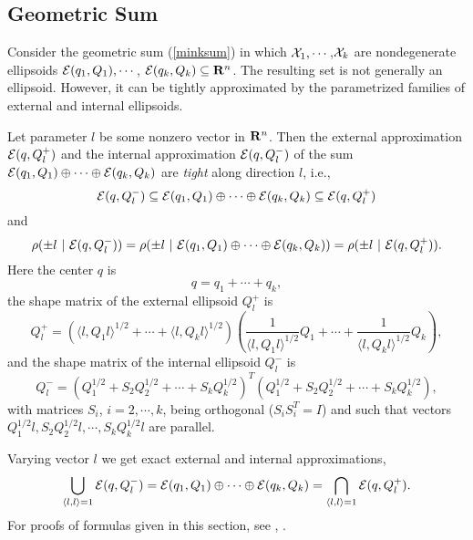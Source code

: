 \subsection{Geometric Sum}
Consider the geometric sum (\ref{minksum}) in which $\XX_1,\cdots$,$\XX_k$
are  nondegenerate ellipsoids
$\EE(q_1,Q_1),\cdots$, $\EE(q_k,Q_k)\subseteq{\bf R}^n$.
The resulting set is not generally  an ellipsoid.
However, it can be tightly approximated by the parametrized families
of external and internal ellipsoids.

Let parameter $l$ be some nonzero vector in ${\bf R}^n$. Then the external
approximation $\EE(q,Q_l^+)$ and the internal approximation $\EE(q,Q_l^-)$
of the sum $\EE(q_1,Q_1)\oplus\cdots\oplus\EE(q_k,Q_k)$ are \emph{tight} along
direction $l$, i.e.,
\[ \EE(q,Q_l^-)\subseteq\EE(q_1,Q_1)\oplus\cdots\oplus\EE(q_k,Q_k)
\subseteq\EE(q,Q_l^+) \]
and
\[ \rho(\pm l ~|~ \EE(q,Q_l^-)) =
\rho(\pm l ~|~ \EE(q_1,Q_1)\oplus\cdots\oplus\EE(q_k,Q_k)) =
\rho(\pm l ~|~ \EE(q,Q_l^+)).\]
Here the center $q$ is
\begin{equation}
q = q_1 + \cdots + q_k , \label{minksum_c}
\end{equation}
the shape matrix of the external ellipsoid $Q_l^+$ is
\begin{equation}
Q_l^+ = \left(\langle l,Q_1l\rangle^{1/2} + \cdots
+ \langle l,Q_kl\rangle^{1/2}\right)
\left(\frac{1}{\langle l,Q_1l\rangle^{1/2}}Q_1 + \cdots +
\frac{1}{\langle l,Q_kl\rangle^{1/2}}Q_k\right), \label{minksum_ea}
\end{equation}
and the shape matrix of the internal ellipsoid $Q_l^-$ is
\begin{equation}
Q_l^- = \left(Q_1^{1/2} + S_2Q_2^{1/2} + \cdots + S_kQ_k^{1/2}\right)^T
\left(Q_1^{1/2} + S_2Q_2^{1/2} + \cdots + S_kQ_k^{1/2}\right),\label{minksum_ia}
\end{equation}
with matrices $S_i$, $i=2,\cdots,k$, being orthogonal ($S_iS_i^T=I$) and such
that vectors $Q_1^{1/2}l, S_2Q_2^{1/2}l, \cdots, S_kQ_k^{1/2}l$ are parallel.

Varying vector $l$ we get exact external and internal approximations,
\[ \bigcup_{\langle l,l\rangle=1} \EE(q,Q_l^-) =
\EE(q_1,Q_1)\oplus\cdots\oplus\EE(q_k,Q_k) =
\bigcap_{\langle l,l\rangle=1} \EE(q,Q_l^+) .\]
For proofs of formulas given in this section, see \cite{kurvalyi},
\cite{kurvar}.

